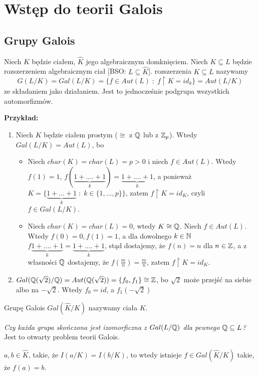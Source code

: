 \section{Wstęp do teorii Galois}

\subsection{Grupy Galois}
    Niech $K$ będzie ciałem, $\hat{K}$ jego algebraicznym domknięciem. Niech $K\subseteq L$ będzie rozszerzeniem algebraicznym ciał [BSO: $L\subseteq\hat{K}$].  rozszerzenia $K\subseteq L$ nazywamy 
    $$G(L/K)=Gal(L/K)=\{f\in Aut(L)\;:\;f\restriction K=id_k\}=Aut(L/K)$$
    ze składaniem jako działaniem. Jest to jednocześnie podgrupa wszystkich automorfizmów.

\textbf{Przykład:}

\begin{enumerate}
    \item  Niech $K$ będzie ciałem prostym ($\cong$ z $\mathbb{Q}$ lub z $\mathbb{Z}_p$). Wtedy $Gal(L/K)=Aut(L)$, bo
    \begin{itemize}
        \item  Niech $char(K)=char(L)=p>0$ i niech $f\in Aut(L)$. Wtedy $f(1)=1$, $f(\underbrace{1+....+1}_k)=\underbrace{1+....+1}_k$, a ponieważ $K=\{\underbrace{1+...+1}_k\;:\;k\in\{1,...,p\}\}$, zatem $f\restriction K=id_K$, czyli $f\in Gal(L/K)$.
        \item Niech $char(K)=char(L)=0$, wtedy $K\cong\mathbb{Q}$. Niech $f\in Aut(L)$. Wtedy $f(0)=0, f(1)=1$, a dla dowolnego $k\in\mathbb{N}$ $f\underbrace{1+....+1}_k=\underbrace{1+....+1}_k$, stąd dostajemy, że $f(n)=n$ dla $n\in\mathbb{Z}$, a z własności $\mathbb{Q}$ dostajemy, że $f(\frac mn)=\frac mn$, zatem $f\restriction K=id_K$.
    \end{itemize}
    \item $Gal(\mathbb{Q}(\sqrt2)/\mathbb{Q})=Aut(\mathbb{Q}(\sqrt2))=\{f_0,f_1\}\cong\mathbb{Z}$, bo $\sqrt{2}$ może przejść na siebie albo na $-\sqrt{2}$. Wtedy $f_0=id$, a $f_1(-\sqrt{2})$ 
\end{enumerate}

    Grupę Galois $Gal(\hat{K}/K)$ nazywamy  ciała $K$.

\emph{Czy każda grupa skończona jest izomorficzna z $Gal(L/\mathbb{Q})$ dla pewnego $\mathbb{Q}\subseteq L$?} Jest to otwarty problem teorii Galois.


\begin{remark}\label{uwaga:6:1}
    $a,b\in\hat{K}$, takie, że $I(a/K)=I(b/K)$, to wtedy istnieje $f\in Gal(\hat{K}/K)$ takie, że $f(a)=b$.
\end{remark}

